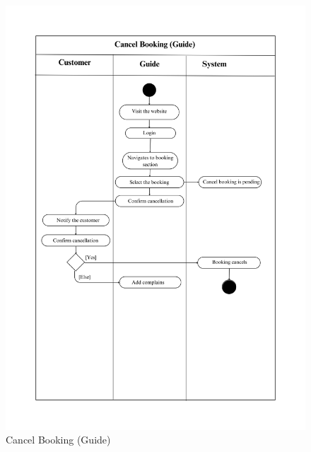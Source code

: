 \begin{figure}[h]
    \centering
    \includegraphics[width=1\textwidth]{Images/Activity Diagrams/25 Cancel Booking (Guide).png}
    \caption{Cancel Booking (Guide)}
    \label{fig:activity-cancel-guide}
\end{figure}

